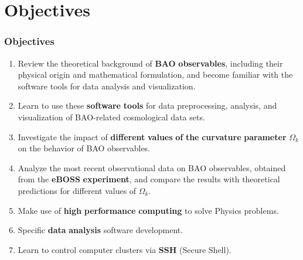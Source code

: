 \documentclass{beamer}
\newcounter{cont}
\begin{document}
\section{Objectives}
\begin{frame}[allowframebreaks]
\frametitle{Objectives}
\begin{enumerate}
  \item Review the theoretical background of \textbf{BAO} \textbf{observables}, including their physical origin and mathematical formulation, and become familiar with the software tools for data analysis and visualization.
  \item Learn to use these \textbf{software} \textbf{tools} for data preprocessing, analysis, and visualization of BAO-related cosmological data sets.
  \item Investigate the impact of \textbf{different} \textbf{values} \textbf{of} \textbf{the} \textbf{curvature} \textbf{parameter} $\Omega_k$ on the behavior of BAO observables.
  \item Analyze the most recent observational data on BAO observables, obtained from the \textbf{eBOSS} \textbf{experiment}, and compare the results with theoretical predictions for different values of $\Omega_k$.
	\item Make use of \textbf{high} \textbf{performance} \textbf{computing} to solve Physics problems.
  \item Specific \textbf{data} \textbf{analysis} software development.
  \item Learn to control computer clusters via \textbf{SSH} (Secure Shell).
\end{enumerate}
\end{frame}
\end{document}
